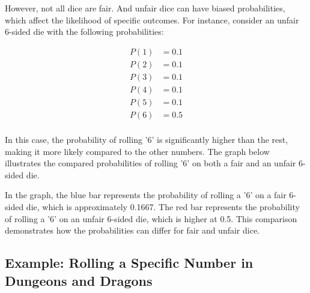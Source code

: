 \documentclass{article}
\begin{document}
However, not all dice are fair. And unfair dice can have biased probabilities, which affect
the likelihood of specific outcomes. For instance, consider an unfair 6-sided die with the following probabilities:

\[
\begin{aligned}
P(1) & = 0.1 \\
P(2) & = 0.1 \\
P(3) & = 0.1 \\
P(4) & = 0.1 \\
P(5) & = 0.1 \\
P(6) & = 0.5 \\
\end{aligned}
\]

In this case, the probability of rolling '6' is significantly higher than the rest, making it more likely
compared to the other numbers. The graph below illustrates the compared probabilities of rolling '6' on both a fair and
an unfair 6-sided die.

\begin{center}
\end{center}


In the graph, the blue bar represents the probability of rolling a '6' on a fair 6-sided die, which is approximately
0.1667. The red bar represents the probability of rolling a '6' on an unfair 6-sided die, which is higher at 0.5. This
comparison demonstrates how the probabilities can differ for fair and unfair dice.

\subsection{Example: Rolling a Specific Number in Dungeons and Dragons}
\end{document}
